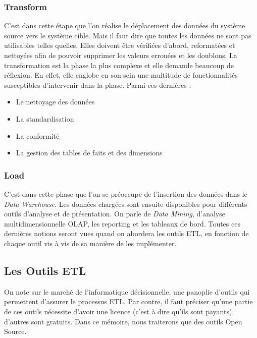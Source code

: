 \documentclass[12pt,a4wide,twoside]{report}
\begin{document}
\subsubsection{Transform}
C’est dans cette étape que l’on réalise le déplacement des données du système source vers le système cible. Mais il faut dire que toutes les données ne sont pas utilisables telles quelles. Elles doivent être vérifiées d’abord, reformatées et nettoyées afin de pouvoir supprimer les valeurs erronées et les doublons. \newline
La transformation est la phase la plus complexe et elle demande beaucoup de réflexion. En effet, elle englobe en son sein une multitude de fonctionnalités susceptibles d’intervenir dans la phase. Parmi ces dernières : \newline
\begin{itemize}
	\item Le nettoyage des données
	\item La standardisation
	\item La conformité
	\item La gestion des tables de faits et des dimensions 
\end{itemize}

\subsubsection{Load}
C’est dans cette phase que l’on se préoccupe de l’insertion des données dans le \emph{Data Warehouse}.\newline
Les données chargées sont ensuite disponibles pour différents outils d’analyse et de présentation. On parle de \emph{Data Mining}, d’analyse multidimensionnelle OLAP, les reporting et les tableaux de bord. \newline
Toutes ces dernières notions seront vues quand on abordera les outils ETL, en fonction de chaque outil vis à vis de sa manière de les implémenter.

\subsection{Les Outils ETL}
On note sur le marché de l’informatique décisionnelle, une panoplie d’outils qui permettent d’assurer le processus ETL. Par contre, il faut préciser qu’une partie de ces outils nécessite d’avoir une licence (c’est à dire qu’ils sont payants), d’autres sont gratuits. \newline
Dans ce mémoire, nous traiterons que des outils Open Source.\newline 
\end{document}

